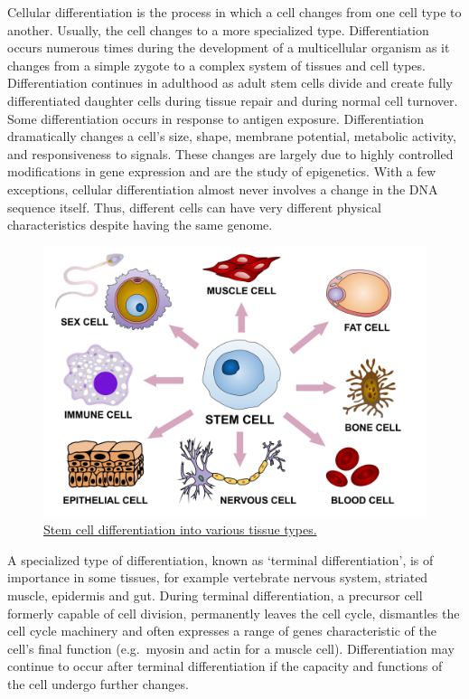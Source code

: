 Cellular differentiation is the process in which a cell changes from one cell type to another. Usually, the cell changes to a more specialized type. Differentiation occurs numerous times during the development of a multicellular organism as it changes from a simple zygote to a complex system of tissues and cell types. Differentiation continues in adulthood as adult stem cells divide and create fully differentiated daughter cells during tissue repair and during normal cell turnover. Some differentiation occurs in response to antigen exposure. Differentiation dramatically changes a cell's size, shape, membrane potential, metabolic activity, and responsiveness to signals. These changes are largely due to highly controlled modifications in gene expression and are the study of epigenetics. With a few exceptions, cellular differentiation almost never involves a change in the DNA sequence itself. Thus, different cells can have very different physical characteristics despite having the same genome.



\begin{figure}

{\centering \includegraphics[width=0.7\linewidth]{./figures/development/Final_stem_cell_differentiation_(1)} 

}

\caption{\href{https://commons.wikimedia.org/wiki/File:Final_stem_cell_differentiation_(1).svg}{Stem cell differentiation into various tissue types.}}\label{fig:cellulardifferentiation}
\end{figure}

A specialized type of differentiation, known as `terminal differentiation', is of importance in some tissues, for example vertebrate nervous system, striated muscle, epidermis and gut. During terminal differentiation, a precursor cell formerly capable of cell division, permanently leaves the cell cycle, dismantles the cell cycle machinery and often expresses a range of genes characteristic of the cell's final function (e.g.~myosin and actin for a muscle cell). Differentiation may continue to occur after terminal differentiation if the capacity and functions of the cell undergo further changes.

